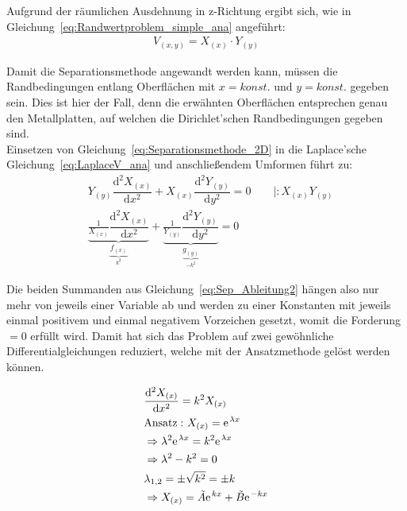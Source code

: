Aufgrund der räumlichen Ausdehnung in z-Richtung ergibt sich, wie in Gleichung~\ref{eq:Randwertproblem_simple_ana} angeführt:
\begin{align}
	\label{eq:Separationsmethode_2D}
	V_{(x,y)} = X_{(x)} \cdot Y_{(y)}
\end{align}

Damit die Separationsmethode angewandt werden kann, müssen die Randbedingungen entlang Oberflächen mit $x = konst.$ und $y = konst.$ gegeben sein. Dies ist hier der Fall, denn die erwähnten Oberflächen entsprechen genau den Metallplatten, auf welchen die Dirichlet'schen Randbedingungen gegeben sind. \\

Einsetzen von Gleichung~\ref{eq:Separationsmethode_2D} in die Laplace'sche Gleichung~\ref{eq:LaplaceV_ana} und anschließendem Umformen führt zu:
\begin{align}
	\label{eq:Sep_Ableitung1}
	&Y_{(y)} \dfrac{\mathrm{d}^2 X_{(x)}}{\mathrm{d}x^2} + X_{(x)} \dfrac{\mathrm{d}^2 Y_{(y)}}{\mathrm{d}y^2} = 0 \qquad | :X_{(x)} Y_{(y)} \\
	&\underbrace{\frac{1}{X_{(x)}} \dfrac{\mathrm{d}^2 X_{(x)}}{\mathrm{d}x^2}}_{\underbrace{f_{(x)}}_{k^2}} + \underbrace{\frac{1}{Y_{(y)}} \dfrac{\mathrm{d}^2 Y_{(y)}}{\mathrm{d}y^2}}_{\underbrace{g_{(y)}}_{-k^2}} = 0 \label{eq:Sep_Ableitung2}
\end{align}

Die beiden Summanden aus Gleichung~\ref{eq:Sep_Ableitung2} hängen also nur mehr von jeweils einer Variable ab und werden zu einer Konstanten mit jeweils einmal positivem und einmal negativem Vorzeichen gesetzt, womit die Forderung $=0$ erfüllt wird. Damit hat sich das Problem auf zwei gewöhnliche Differentialgleichungen reduziert, welche mit der Ansatzmethode gelöst werden können. 

\begin{align}
	&\dfrac{\mathrm{d}^2 X_{(x)}}{\mathrm{d}x^2} = k^2 X_{(x)} \\
	&\mathrm{Ansatz:}~X_{(x)} = \e^{\lambda x} \\
	&\Rightarrow \lambda^2 \e^{\lambda x} = k^2 \e^{\lambda x} \\
	&\Rightarrow \lambda^2 - k^2 = 0 \\
	&\lambda_{1,2} = \pm \sqrt{k^2} = \pm k \\
	&\Rightarrow X_{(x)} = \tilde{A} \e^{kx} + \tilde{B} \e^{-kx}
\end{align}

